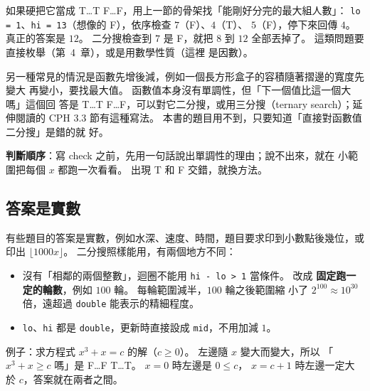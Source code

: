 \begin{center}
\label{fig:bs-nonmono}
\end{center}

如果硬把它當成 T…T F…F，用上一節的骨架找「能剛好分完的最大組人數」：
\texttt{lo = 1}、\texttt{hi = 13}（想像的 F），依序檢查 $7$（F）、$4$（T）、
$5$（F），停下來回傳 $4$。 真正的答案是 $12$。 二分搜檢查到 $7$ 是 F，就把
$8$ 到 $12$ 全部丟掉了。 這類問題要直接枚舉（第~4~章），或是用數學性質（這裡
是因數）。

另一種常見的情況是函數先增後減，例如一個長方形盒子的容積隨著摺邊的寬度先變大
再變小，要找最大值。 函數值本身沒有單調性，但「下一個值比這一個大嗎」這個回
答是 T…T F…F，可以對它二分搜，或用三分搜（ternary search）；延伸閱讀的 CPH
3.3 節有這種寫法。 本書的題目用不到，只要知道「直接對函數值二分搜」是錯的就
好。

\textbf{判斷順序}：寫 check 之前，先用一句話說出單調性的理由；說不出來，就在
小範圍把每個 $x$ 都跑一次看看。 出現 T 和 F 交錯，就換方法。

\subsection{答案是實數}
\label{sec:bs-real}

有些題目的答案是實數，例如水深、速度、時間，題目要求印到小數點後幾位，或印出
$\lfloor 1000x \rfloor$。 二分搜照樣能用，有兩個地方不同：

\begin{itemize}
\item 沒有「相鄰的兩個整數」，迴圈不能用 \texttt{hi - lo > 1} 當條件。 改成
\textbf{固定跑一定的輪數}，例如 $100$ 輪。 每輪範圍減半，$100$ 輪之後範圍縮
小了 $2^{100} \approx 10^{30}$ 倍，遠超過 \texttt{double} 能表示的精細程度。
\item \texttt{lo}、\texttt{hi} 都是 \texttt{double}，更新時直接設成
\texttt{mid}，不用加減 $1$。
\end{itemize}

例子：求方程式 $x^3 + x = c$ 的解（$c \ge 0$）。 左邊隨 $x$ 變大而變大，所以
「$x^3 + x \ge c$ 嗎」是 F…F T…T。 $x = 0$ 時左邊是 $0 \le c$，
$x = c + 1$ 時左邊一定大於 $c$，答案就在兩者之間。

